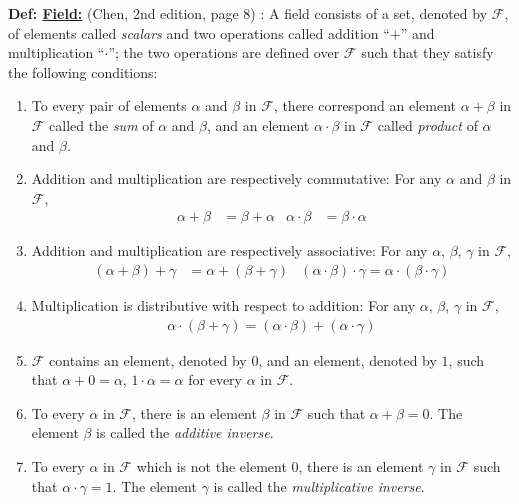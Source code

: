 \documentclass[letterpaper]{article}
\begin{document}
\noindent \textbf{Def: \underline{Field:}} (Chen, 2nd edition, page 8) : A field consists of a set, denoted by $\mathcal{F}$, of elements called \textit{scalars} and two operations called addition ``$+$'' and multiplication ``$\cdot$''; the two operations are defined over $\mathcal{F}$ such that they satisfy the following conditions:
    \begin{enumerate}
        \item To every pair of elements $\alpha$ and $\beta$ in $\mathcal{F}$, there correspond an element $\alpha+\beta$ in $\mathcal{F}$ called the \textit{sum} of $\alpha$ and $\beta$, and an element $\alpha \cdot \beta$ in $\mathcal{F}$ called \textit{product} of $\alpha$ and $\beta$.
        \item Addition and multiplication are respectively commutative: For any $\alpha$ and $\beta$ in $\mathcal{F}$,
        \begin{align*}
            \alpha+\beta &= \beta + \alpha & \alpha\cdot\beta &= \beta\cdot\alpha
        \end{align*}
        \item Addition and multiplication are respectively associative: For any $\alpha$, $\beta$, $\gamma$ in $\mathcal{F}$,
        \begin{align*}
            \left(\alpha+\beta\right)+\gamma &= \alpha + \left(\beta+\gamma\right) & \left(\alpha\cdot\beta\right)\cdot\gamma = \alpha\cdot\left(\beta\cdot\gamma\right)
        \end{align*}
        \item Multiplication is distributive with respect to addition: For any $\alpha$, $\beta$, $\gamma$ in $\mathcal{F}$,
        \begin{align*}
            \alpha\cdot\left(\beta+\gamma\right) = \left(\alpha\cdot\beta\right)+\left(\alpha\cdot\gamma\right)
        \end{align*}
        \item $\mathcal{F}$ contains an element, denoted by $0$, and an element, denoted by $1$, such that $\alpha + 0 = \alpha$, $1\cdot\alpha = \alpha$ for every $\alpha$ in $\mathcal{F}$.
        \item To every $\alpha$ in $\mathcal{F}$, there is an element $\beta$ in $\mathcal{F}$ such that $\alpha+\beta = 0$. The element $\beta$ is called the \textit{additive inverse}.
        \item To every $\alpha$ in $\mathcal{F}$ which is not the element 0, there is an element $\gamma$ in $\mathcal{F}$ such that $\alpha\cdot\gamma = 1$. The element $\gamma$ is called the \textit{multiplicative inverse}.
    \end{enumerate}
\end{document}
